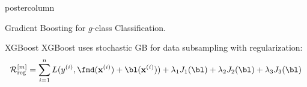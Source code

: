 \documentclass{beamer}
\begin{document}
\begin{frame}[fragile]{}
\begin{columns}
\begin{column}{.31\textwidth}
\begin{beamercolorbox}[center]{postercolumn}
\begin{minipage}{.98\textwidth}
{\begin{myblock}{}
\begin{algorithm}[H]
  \begin{center}
  \caption{Gradient Boosting for $g$-class Classification.}
    \end{center}
\end{algorithm}
  \end{myblock}


  \begin{myblock}{XGBoost}
XGBoost uses stochastic GB for data subsampling with regularization:   
$$
    \riskr^{[m]} = \sum_{i=1}^{n} L(\yi, \fmd(\xi) + \bl(\xi))
    + \lambda_1 J_1(\bl) + \lambda_2 J_2(\bl) + \lambda_3 J_3(\bl)
$$


\end{myblock}

}
\end{minipage}
\end{beamercolorbox}
\end{column}



\end{columns}
\end{frame}
\end{document}
